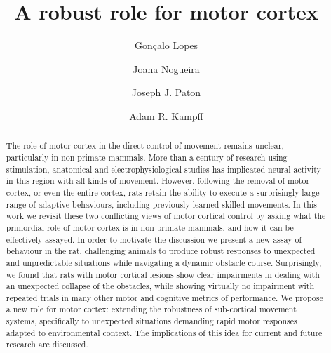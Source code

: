 \documentclass[12pt]{article}
\title{A robust role for motor cortex}
\author{Gonçalo Lopes}
\author{Joana Nogueira}
\author{Joseph J. Paton}
\author{Adam R. Kampff}
\affil{Champalimaud Neuroscience Programme\\ Champalimaud Centre for the Unknown, Lisbon, Portugal}
\newcounter{video}
\begin{document}
\maketitle

\begin{linenumbers}
\begin{abstract}
The role of motor cortex in the direct control of movement remains unclear, particularly in non-primate mammals. More than a century of research using stimulation, anatomical and electrophysiological studies has implicated neural activity in this region with all kinds of movement. However, following the removal of motor cortex, or even the entire cortex, rats retain the ability to execute a surprisingly large range of adaptive behaviours, including previously learned skilled movements. In this work we revisit these two conflicting views of motor cortical control by asking what the primordial role of motor cortex is in non-primate mammals, and how it can be effectively assayed. In order to motivate the discussion we present a new assay of behaviour in the rat, challenging animals to produce robust responses to unexpected and unpredictable situations while navigating a dynamic obstacle course. Surprisingly, we found that rats with motor cortical lesions show clear impairments in dealing with an unexpected collapse of the obstacles, while showing virtually no impairment with repeated trials in many other motor and cognitive metrics of performance. We propose a new role for motor cortex: extending the robustness of sub-cortical movement systems, specifically to unexpected situations demanding rapid motor responses adapted to environmental context. The implications of this idea for current and future research are discussed.
\end{abstract}








\end{linenumbers}

\setcounter{biburlnumpenalty}{100}
\setcounter{biburlucpenalty}{100}
\setcounter{biburllcpenalty}{100}
\printbibliography
\end{document}
